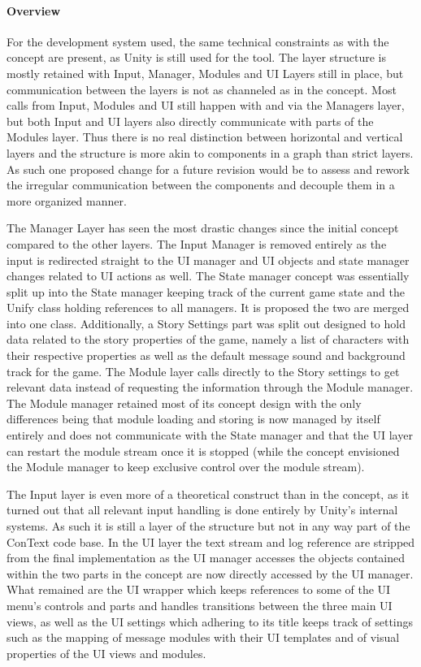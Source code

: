 \paragraph{Overview} For the development system used, the same technical constraints as with the concept are present, as Unity is still used for the tool. 
The layer structure is mostly retained with Input, Manager, Modules and UI Layers still in place, but communication between the layers is not as channeled as in the concept. Most calls from Input, Modules and UI still happen with and via the Managers layer, but both Input and UI layers also directly communicate with parts of the Modules layer. Thus there is no real distinction between horizontal and vertical layers and the structure is more akin to components in a graph than strict layers. As such one proposed change for a future revision would be to assess and rework the irregular communication between the components and decouple them in a more organized manner. 

The Manager Layer has seen the most drastic changes since the initial concept compared to the other layers. The Input Manager is removed entirely as the input is redirected straight to the UI manager and UI objects and state manager changes related to UI actions as well. The State manager concept was essentially split up into the State manager keeping track of the current game state and the Unify class holding references to all managers. It is proposed the two are merged into one class. Additionally, a Story Settings part was split out designed to hold data related to the story properties of the game, namely a list of characters with their respective properties as well as the default message sound and background track for the game. The Module layer calls directly to the Story settings to get relevant data instead of requesting the information through the Module manager. The Module manager retained most of its concept design with the only differences being that module loading and storing is now managed by itself entirely and does not communicate with the State manager and that the UI layer can restart the module stream once it is stopped (while the concept envisioned the Module manager to keep exclusive control over the module stream).

The Input layer is even more of a theoretical construct than in the concept, as it turned out that all relevant input handling is done entirely by Unity's internal systems. As such it is still a layer of the structure but not in any way part of the ConText code base.
In the UI layer the text stream and log reference are stripped from the final implementation as the UI manager accesses the objects contained within the two parts in the concept are now directly accessed by the UI manager. What remained are the UI wrapper which keeps references to some of the UI menu's controls and parts and handles transitions between the three main UI views, as well as the UI settings which adhering to its title keeps track of settings such as the mapping of message modules with their UI templates and of visual properties of the UI views and modules. 

